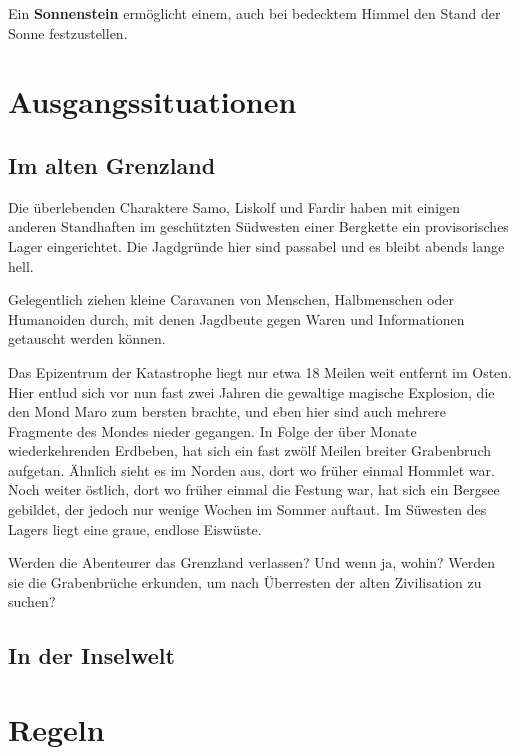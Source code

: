 \documentclass[11pt]{wbzine}
\begin{document}
\begin{multicols}{2}

    Ein \textbf{Sonnenstein} ermöglicht einem, auch bei bedecktem
    Himmel den Stand der Sonne festzustellen.

    \section{Ausgangssituationen}
    \subsection{Im alten Grenzland}

    Die überlebenden Charaktere Samo, Liskolf und Fardir haben mit
    einigen anderen Standhaften im geschützten Südwesten einer
    Bergkette ein provisorisches Lager eingerichtet. Die Jagdgründe
    hier sind passabel und es bleibt abends lange hell.

    Gelegentlich ziehen kleine Caravanen von Menschen, Halbmenschen
    oder Humanoiden durch, mit denen Jagdbeute gegen Waren und
    Informationen getauscht werden können. 


    Das Epizentrum der Katastrophe liegt nur etwa 18 Meilen weit
    entfernt im Osten. Hier entlud sich vor nun fast zwei Jahren die
    gewaltige magische Explosion, die den Mond Maro zum bersten
    brachte, und eben hier sind auch mehrere Fragmente des Mondes
    nieder gegangen. In Folge der über Monate wiederkehrenden
    Erdbeben, hat sich ein fast zwölf Meilen breiter Grabenbruch
    aufgetan. Ähnlich sieht es im Norden aus, dort wo früher einmal
    Hommlet war. Noch weiter östlich, dort wo früher einmal die
    Festung war, hat sich ein Bergsee gebildet, der jedoch nur
    wenige Wochen im Sommer auftaut. Im Süwesten des Lagers liegt
    eine graue, endlose Eiswüste.

    Werden die Abenteurer das Grenzland verlassen? Und wenn ja,
    wohin? Werden sie die Grabenbrüche erkunden, um nach Überresten
    der alten Zivilisation zu suchen?

    \subsection{In der Inselwelt}


\section{Regeln}


\end{multicols}
\end{document}
